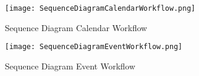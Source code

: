\begin{figure}[ht!]
\centering
\texttt{[image: SequenceDiagramCalendarWorkflow.png]}
\caption{Sequence Diagram Calendar Workflow  \label{overflow}}
\end{figure}

\newpage
\begin{figure}[ht!]
\centering
\texttt{[image: SequenceDiagramEventWorkflow.png]}
\caption{Sequence Diagram Event Workflow  \label{overflow}}
\end{figure} 